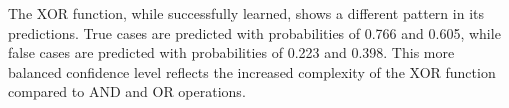 \documentclass[11pt,a4paper]{article}
\begin{document}
The XOR function, while successfully learned, shows a different pattern in its predictions. True cases are predicted with probabilities of 0.766 and 0.605, while false cases are predicted with probabilities of 0.223 and 0.398. This more balanced confidence level reflects the increased complexity of the XOR function compared to AND and OR operations.

\begin{figure}[H]
    \centering
\end{figure}
\end{document}
